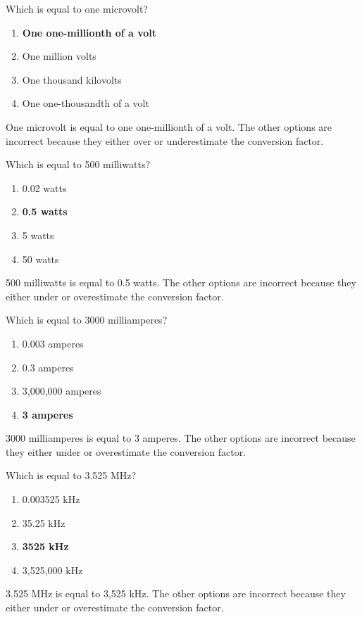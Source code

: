 \begin{tcolorbox}[colback=gray!10!white,colframe=black!75!black,title={T5B04}]
    Which is equal to one microvolt?
    \begin{enumerate}[label=\Alph*),noitemsep]
        \item \textbf{One one-millionth of a volt}
        \item One million volts
        \item One thousand kilovolts
        \item One one-thousandth of a volt
    \end{enumerate}
\end{tcolorbox}
One microvolt is equal to one one-millionth of a volt. The other options are incorrect because they either over or underestimate the conversion factor.

\begin{tcolorbox}[colback=gray!10!white,colframe=black!75!black,title={T5B05}]
    Which is equal to 500 milliwatts?
    \begin{enumerate}[label=\Alph*),noitemsep]
        \item 0.02 watts
        \item \textbf{0.5 watts}
        \item 5 watts
        \item 50 watts
    \end{enumerate}
\end{tcolorbox}
500 milliwatts is equal to 0.5 watts. The other options are incorrect because they either under or overestimate the conversion factor.

\begin{tcolorbox}[colback=gray!10!white,colframe=black!75!black,title={T5B06}]
    Which is equal to 3000 milliamperes?
    \begin{enumerate}[label=\Alph*),noitemsep]
        \item 0.003 amperes
        \item 0.3 amperes
        \item 3,000,000 amperes
        \item \textbf{3 amperes}
    \end{enumerate}
\end{tcolorbox}
3000 milliamperes is equal to 3 amperes. The other options are incorrect because they either under or overestimate the conversion factor.

\begin{tcolorbox}[colback=gray!10!white,colframe=black!75!black,title={T5B07}]
    Which is equal to 3.525 MHz?
    \begin{enumerate}[label=\Alph*),noitemsep]
        \item 0.003525 kHz
        \item 35.25 kHz
        \item \textbf{3525 kHz}
        \item 3,525,000 kHz
    \end{enumerate}
\end{tcolorbox}
3.525 MHz is equal to 3,525 kHz. The other options are incorrect because they either under or overestimate the conversion factor.

